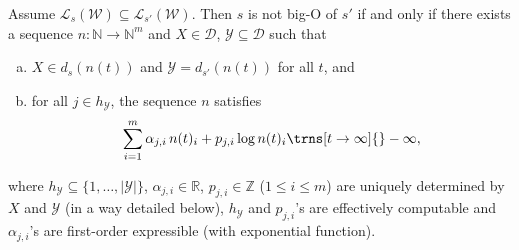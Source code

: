 \documentclass[10pt,a4paper]{amsart}
\numberwithin{equation}{section}
\theoremstyle{plain}
\theoremstyle{definition}
\theoremstyle{remark}
\newcommand\lng[2]{\mathcal{L}_{#1}(#2)}
\newcommand\dgf{d}
\newcommand\adm{\mathcal{D}}
\newcommand\wa{\mathcal{W}}
\begin{document}
\begin{lem}\label{lem:natlogicalformulationfirst}
Assume  $\lng{s}{\wa}\subseteq \lng{s'}{\wa}$.  Then
$s$ is not big-O of $s'$ if and only if there exists a sequence $n \colon \mathbb{N} \to \mathbb{N}^m$ and $X\in\adm$, $\mathcal{Y}\subseteq\adm$ such that
\begin{enumerate}[(a)]
\item \label{item:condition1} $X\in \dgf_s(n(t))$ and $\mathcal{Y}=\dgf_{s'}(n(t))$ for all $t$, and
\item \label{item:condition2} for all $j \in h_{\mathcal{Y}}$, the sequence $n$ satisfies
\[\sum_{i = 1}^m \alpha_{j,i} \,n(t)_i +  p_{j,i}\log n(t)_i \trns[t\to\infty]{} -\infty,\]
\end{enumerate}
where $h_{\mathcal{Y}} \subseteq \{1,\dots, |\mathcal{Y}|\}$, $\alpha_{j,i}\in \mathbb{R}$, $p_{j,i}\in \mathbb{Z}$ ($1\le i \le m$) are uniquely determined by $X$ and $\mathcal{Y}$ (in a way detailed below),  $h_{\mathcal{Y}}$  and $p_{j,i}$'s are effectively computable and $\alpha_{j,i}$'s are first-order expressible (with exponential function).

\end{lem}
\end{document}
